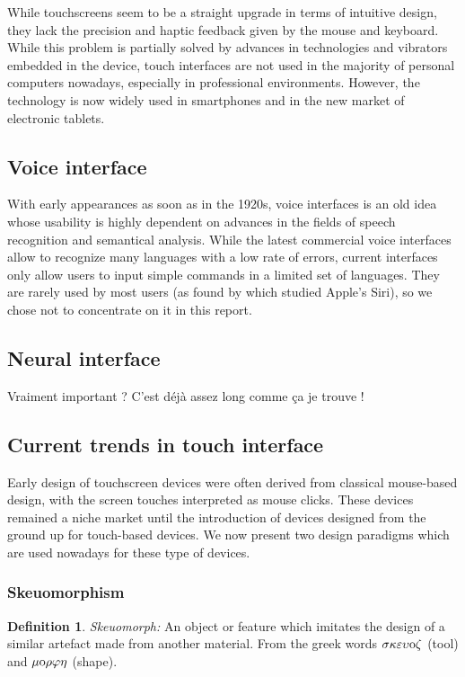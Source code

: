 \documentclass[a4paper,11pt] {article}
\theoremstyle{definition}
\newtheorem{defn}{Definition}[section]
\begin{document}
    While touchscreens seem to be a straight upgrade in terms of intuitive design, they lack the precision and haptic feedback given by the mouse and keyboard. While this problem is partially solved by advances in technologies and vibrators embedded in the device, touch interfaces are not used in the majority of personal computers nowadays, especially in professional environments. However, the technology is now widely used in smartphones and in the new market of electronic tablets.

    \subsection{Voice interface}

    With early appearances as soon as in the 1920s, voice interfaces is an old idea whose usability is highly dependent on advances in the fields of speech recognition and semantical analysis. While the latest commercial voice interfaces allow to recognize many languages with a low rate of errors, current interfaces only allow users to input simple commands in a limited set of languages. They are rarely used by most users (as found by \cite{SiriNotUsed} which studied Apple's Siri), so we chose not to concentrate on it in this report.

    \subsection{Neural interface}

    Vraiment important ? C'est déjà assez long comme ça je trouve !

    \subsection{Current trends in touch interface}

    Early design of touchscreen devices were often derived from classical mouse-based design, with the screen touches interpreted as mouse clicks. These devices remained a niche market until the introduction of devices designed from the ground up for touch-based devices. We now present two design paradigms which are used nowadays for these type of devices.

        \subsubsection{Skeuomorphism}
        \begin{defn}
        \textit{Skeuomorph:} An object or feature which imitates the design of a similar artefact made from another material. From the greek words $\sigma \kappa \varepsilon \upsilon {\rm o} \zeta$ (tool) and $\mu {\rm o} \rho \varphi \eta$ (shape).
        \end{defn}
\end{document}
